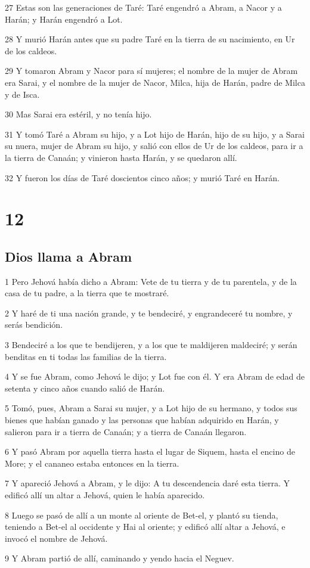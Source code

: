\par 27 Estas son las generaciones de Taré: Taré engendró a Abram, a Nacor y a Harán; y Harán engendró a Lot.
\par 28 Y murió Harán antes que su padre Taré en la tierra de su nacimiento, en Ur de los caldeos.
\par 29 Y tomaron Abram y Nacor para sí mujeres; el nombre de la mujer de Abram era Sarai, y el nombre de la mujer de Nacor, Milca, hija de Harán, padre de Milca y de Isca.
\par 30 Mas Sarai era estéril, y no tenía hijo.
\par 31 Y tomó Taré a Abram su hijo, y a Lot hijo de Harán, hijo de su hijo, y a Sarai su nuera, mujer de Abram su hijo, y salió con ellos de Ur de los caldeos, para ir a la tierra de Canaán; y vinieron hasta Harán, y se quedaron allí.
\par 32 Y fueron los días de Taré doscientos cinco años; y murió Taré en Harán.

\chapter{12}

\section*{Dios llama a Abram}

\par 1 Pero Jehová había dicho a Abram: Vete de tu tierra y de tu parentela, y de la casa de tu padre, a la tierra que te mostraré.
\par 2 Y haré de ti una nación grande, y te bendeciré, y engrandeceré tu nombre, y serás bendición.
\par 3 Bendeciré a los que te bendijeren, y a los que te maldijeren maldeciré; y serán benditas en ti todas las familias de la tierra.
\par 4 Y se fue Abram, como Jehová le dijo; y Lot fue con él. Y era Abram de edad de setenta y cinco años cuando salió de Harán.
\par 5 Tomó, pues, Abram a Sarai su mujer, y a Lot hijo de su hermano, y todos sus bienes que habían ganado y las personas que habían adquirido en Harán, y salieron para ir a tierra de Canaán; y a tierra de Canaán llegaron.
\par 6 Y pasó Abram por aquella tierra hasta el lugar de Siquem, hasta el encino de More; y el cananeo estaba entonces en la tierra.
\par 7 Y apareció Jehová a Abram, y le dijo: A tu descendencia daré esta tierra. Y edificó allí un altar a Jehová, quien le había aparecido.
\par 8 Luego se pasó de allí a un monte al oriente de Bet-el, y plantó su tienda, teniendo a Bet-el al occidente y Hai al oriente; y edificó allí altar a Jehová, e invocó el nombre de Jehová.
\par 9 Y Abram partió de allí, caminando y yendo hacia el Neguev.

